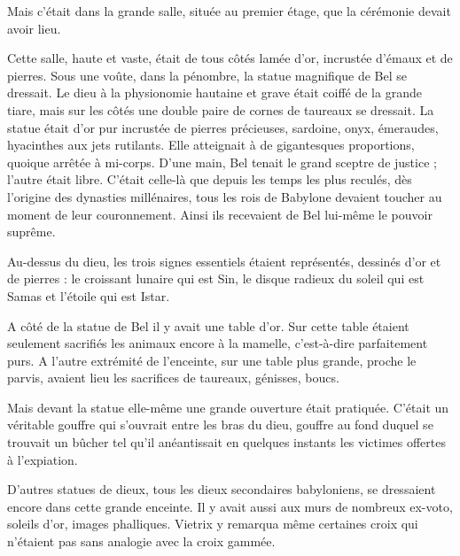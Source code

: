 \documentclass[a4paper, 11pt, oneside, polutonikogreek, french]{article}
\begin{document}
\bigskip
\centerline{\EightStarTaper}
\centerline{\EightStarTaper\EightStarTaper}
\bigskip

Mais c'était dans la grande salle, située au premier étage, que la cérémonie devait avoir lieu.

Cette salle, haute et vaste, était de tous côtés lamée d'or, incrustée d'émaux et de pierres. Sous une voûte, dans la pénombre, la statue magnifique de Bel se dressait. Le dieu à la physionomie hautaine et grave était coiffé de la grande tiare, mais sur les côtés une double paire de cornes de taureaux se dressait. La statue était d'or pur incrustée de pierres précieuses, sardoine, onyx, émeraudes, hyacinthes aux jets rutilants. Elle atteignait à de gigantesques proportions, quoique arrêtée à mi-corps. D'une main, Bel tenait le grand sceptre de justice ; l'autre était libre. C'était celle-là que depuis les temps les plus reculés, dès l'origine des dynasties millénaires, tous les rois de Babylone devaient toucher au moment de leur couronnement. Ainsi ils recevaient de Bel lui-même le pouvoir suprême.

\bigskip
\centerline{\EightStarTaper}
\centerline{\EightStarTaper\EightStarTaper}
\bigskip

Au-dessus du dieu, les trois signes essentiels étaient représentés, dessinés d'or et de pierres : le croissant lunaire qui est Sin, le disque radieux du soleil qui est Samas et l'étoile qui est Istar.

A côté de la statue de Bel il y avait une table d'or. Sur cette table étaient seulement sacrifiés les animaux encore à la mamelle, c'est-à-dire parfaitement purs. A l'autre extrémité de l'enceinte, sur une table plus grande, proche le parvis, avaient lieu les sacrifices de taureaux, génisses, boucs.

Mais devant la statue elle-même une grande ouverture était pratiquée. C'était un véritable gouffre qui s'ouvrait entre les bras du dieu, gouffre au fond duquel se trouvait un bûcher tel qu'il anéantissait en quelques instants les victimes offertes à l'expiation.

D'autres statues de dieux, tous les dieux secondaires babyloniens, se dressaient encore dans cette grande enceinte. Il y avait aussi aux murs de nombreux ex-voto, soleils d'or, images phalliques. Vietrix y remarqua même certaines croix qui n'étaient pas sans analogie avec la croix gammée.
\end{document}
